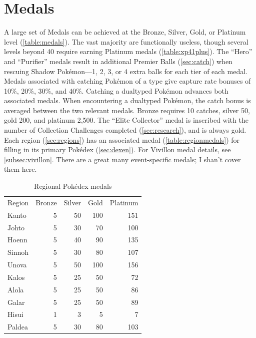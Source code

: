 \section{Medals\label{sec:medals}}
A large set of Medals can be achieved at the Bronze, Silver, Gold, or Platinum level (\autoref{table:medals}).
The vast majority are functionally useless, though several levels beyond 40 require earning
  Platinum medals (\autoref{table:xp41plus}).
The ``Hero'' and ``Purifier'' medals result in additional Premier Balls (\autoref{sec:catch})
  when rescuing Shadow Pokémon---1, 2, 3, or 4 extra balls for each tier of each medal.
Medals associated with catching Pokémon of a type give capture rate bonuses of 10\%, 20\%, 30\%, and 40\%.
Catching a dualtyped Pokémon advances both associated medals.
When encountering a dualtyped Pokémon, the catch bonus is averaged between the two relevant medals.
Bronze requires 10 catches, silver 50, gold 200, and platinum 2,500.
The ``Elite Collector'' medal is inscribed with the number of Collection
  Challenges completed (\autoref{sec:research}), and is always gold.
Each region (\autoref{sec:regions}) has an associated medal (\autoref{table:regionmedals}) for filling
  in its primary Pokédex (\autoref{sec:dexen}).
For Vivillon medal details, see \autoref{subsec:vivillon}.
There are a great many event-specific medals; I shan't cover them here.
\begin{table}[t]
\centering
\footnotesize
\begin{tabular}{lrrrr}
  Region & Bronze & Silver & Gold & Platinum\\
  \Midrule
  Kanto & 5 & 50 & 100 & 151\\
  Johto & 5 & 30 & 70 & 100\\
  Hoenn & 5 & 40 & 90 & 135\\
  Sinnoh & 5 & 30 & 80 & 107\\
  Unova & 5 & 50 & 100 & 156\\
  Kalos & 5 & 25 & 50 & 72\\
  Alola & 5 & 25 & 50 & 86\\
  Galar & 5 & 25 & 50 & 89\\
  Hisui & 1 & 3 & 5 & 7\\
  Paldea & 5 & 30 & 80 & 103\\
\end{tabular}
  \caption{Regional Pokédex medals\label{table:regionmedals}}
\end{table}
